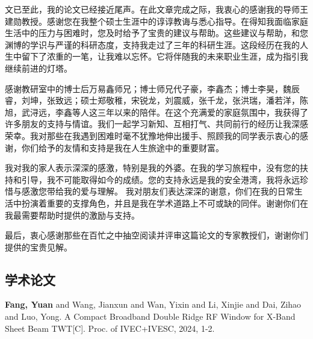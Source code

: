 \documentclass[master]{thesis-uestc}
\begin{document}
\thesisacknowledgement
文已至此，我的论文已经接近尾声。在此文章完成之际，我衷心的感谢我的导师王建勋教授。感谢您在我整个硕士生涯中的谆谆教诲与悉心指导。在得知我面临家庭生活中的压力与困难时，您及时给予了宝贵的建议与帮助。这些建议与帮助，和您渊博的学识与严谨的科研态度，支持我走过了三年的科研生涯。这段经历在我的人生中留下了浓重的一笔，让我难以忘怀。它将伴随我的未来职业生涯，成为指引我继续前进的灯塔。

感谢教研室中的博士后万易鑫师兄；博士师兄代子豪，李鑫杰；博士李昊，魏辰睿，刘坤，张致远；硕士郑敬稚，宋锐龙，刘震威，张千龙，张洪瑞，潘若洋，陈旭，武浔远，李鑫等人这三年以来的陪伴。在这个充满爱的家庭氛围中，我获得了许多朋友的支持与情谊。我们一起学习新知、互相打气、共同前行的经历让我深感荣幸。我对那些在我遇到困难时毫不犹豫地伸出援手、照顾我的同学表示衷心的感谢，你们给予的友情和支持是我在人生旅途中的重要财富。

我对我的家人表示深深的感激，特别是我的外婆。在我的学习旅程中，没有您的扶持和引导，我不可能取得如今的成绩。您的支持永远是我的安全港湾，我将永远珍惜与感激您带给我的爱与理解。
我对朋友们表达深深的谢意，你们在我的日常生活中扮演着重要的支撑角色，并且是我在学术道路上不可或缺的同伴。谢谢你们在我最需要帮助时提供的激励与支持。


最后，衷心感谢那些在百忙之中抽空阅读并评审这篇论文的专家教授们，谢谢你们提供的宝贵见解。





\begin{thesistheaccomplish}
    \section{学术论文}
     \textbf{Fang, Yuan} and Wang, Jianxun and Wan, Yixin and Li, Xinjie and Dai, Zihao and Luo, Yong. A Compact Broadband Double Ridge RF Window for X-Band Sheet Beam TWT[C]. Proc. of IVEC+IVESC, 2024, 1-2.
\end{thesistheaccomplish}


\end{document}
